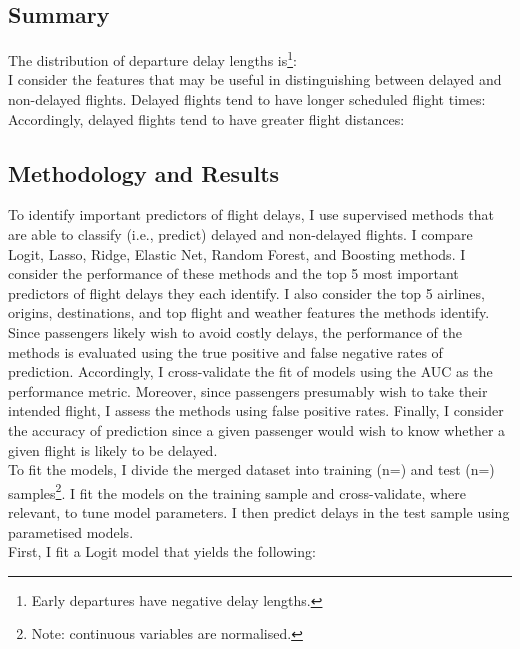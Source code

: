 \documentclass[
]{article}
\begin{document}
\subsection{Summary}

The distribution of departure delay lengths
is\footnote{Early departures have negative delay lengths.}:\\

I consider the features that may be useful in distinguishing between
delayed and non-delayed flights. Delayed flights tend to have longer
scheduled flight times:\\

Accordingly, delayed flights tend to have greater flight distances:

\subsection{Methodology and Results}

To identify important predictors of flight delays, I use supervised
methods that are able to classify (i.e., predict) delayed and
non-delayed flights. I compare Logit, Lasso, Ridge, Elastic Net, Random
Forest, and Boosting methods. I consider the performance of these
methods and the top 5 most important predictors of flight delays they
each identify. I also consider the top 5 airlines, origins,
destinations, and top flight and weather features the methods
identify.\\

Since passengers likely wish to avoid costly delays, the performance of
the methods is evaluated using the true positive and false negative
rates of prediction. Accordingly, I cross-validate the fit of models
using the AUC as the performance metric. Moreover, since passengers
presumably wish to take their intended flight, I assess the methods
using false positive rates. Finally, I consider the accuracy of
prediction since a given passenger would wish to know whether a given
flight is likely to be delayed.\\

To fit the models, I divide the merged dataset into training (n=) and
test (n=) samples\footnote{Note: continuous variables are normalised.}.
I fit the models on the training sample and cross-validate, where
relevant, to tune model parameters. I then predict delays in the test
sample using parametised models.\\

First, I fit a Logit model that yields the following:\\
\end{document}
